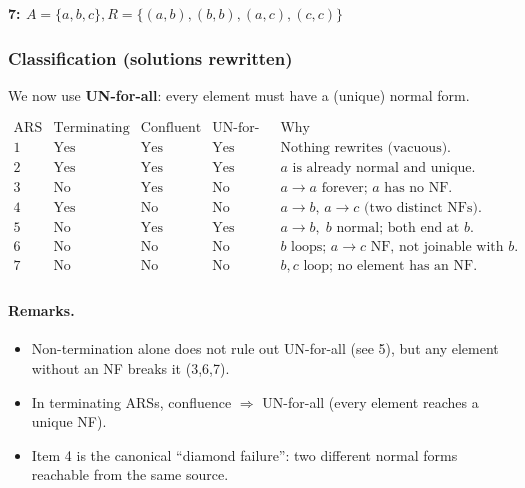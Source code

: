 \documentclass{article}
\theoremstyle{theorem}
\theoremstyle{definition}
\theoremstyle{remark}
\begin{document}

\textbf{7: $A=\{a,b,c\}, R=\{(a,b),(b,b),(a,c),(c,c)\}$}

\subsubsection*{Classification (solutions rewritten)}
We now use \textbf{UN-for-all}: every element must have a (unique) normal form.

\[
\begin{array}{c|c|c|c|l}
\text{ARS} & \text{Terminating} & \text{Confluent} & \text{UN-for-all} & \text{Why} \\\hline
1 & \text{Yes} & \text{Yes} & \text{Yes} & \text{Nothing rewrites (vacuous).} \\
2 & \text{Yes} & \text{Yes} & \text{Yes} & a \text{ is already normal and unique.} \\
3 & \text{No} & \text{Yes} & \text{No}  & a \to a \text{ forever; } a \text{ has no NF.} \\
4 & \text{Yes} & \text{No}  & \text{No}  & a\to b,\,a\to c \text{ (two distinct NFs).} \\
5 & \text{No} & \text{Yes} & \text{Yes} & a\to b,\; b \text{ normal; both end at } b. \\
6 & \text{No} & \text{No}  & \text{No}  & b \text{ loops; } a\to c \text{ NF, not joinable with } b. \\
7 & \text{No} & \text{No}  & \text{No}  & b,c \text{ loop; no element has an NF.} \\
\end{array}
\]

\paragraph{Remarks.}
\begin{itemize}
  \item Non-termination alone does not rule out UN-for-all (see 5), but any element without an NF breaks it (3,6,7).
  \item In terminating ARSs, confluence $\Rightarrow$ UN-for-all (every element reaches a unique NF).
  \item Item 4 is the canonical ``diamond failure'': two different normal forms reachable from the same source.
\end{itemize}
\end{document}
